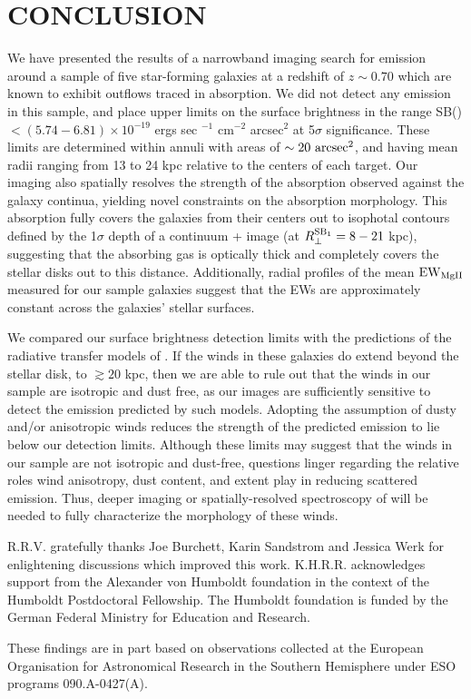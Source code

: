 \documentclass[twocolumn]{aastex62}
\begin{document}
\section{CONCLUSION}\label{sec:conclusion}
We have presented the results of a narrowband imaging search for  emission around a sample of five star-forming galaxies at a redshift of $z \sim 0.70$ which are known to exhibit outflows traced in  absorption. We did not detect any  emission in this sample, and place  upper limits on the surface brightness in the range SB() $< (5.74-6.81) \times 10^{-19}$ ergs sec $^{-1}$ cm$^{-2}$ arcsec$^2$ at 5$\sigma$ significance. These limits are determined within annuli with areas of $\sim 20~\rm arcsec^2$, and having mean radii ranging from 13 to 24 kpc relative to the centers of each target. Our imaging also spatially resolves the strength of the  absorption observed against the galaxy continua, yielding novel constraints on the  absorption morphology. 
This absorption fully covers the galaxies from their centers out to isophotal contours defined by the %
1$\sigma$ depth of a continuum +  image (at %
$R_{\perp}^{\rm SB_1} = 8-21$ kpc),
suggesting that the absorbing gas is optically thick and completely covers the stellar disks out to this distance. Additionally, radial profiles of the mean $\rm EW_{MgII}$ measured for our sample galaxies suggest that the EWs %
are approximately constant across the galaxies' stellar surfaces. 

We compared our surface brightness detection limits with the predictions of the radiative transfer models of \cite{Prochaska_2011}. If the winds in these galaxies do extend beyond the stellar disk, to $\gtrsim 20$ kpc, then we are able to rule out that the winds in our sample are isotropic and dust free, as our images are sufficiently sensitive to detect the emission predicted by such models. Adopting the assumption of dusty and/or anisotropic winds reduces the strength of the predicted  emission to lie below our detection limits. Although these limits may suggest that the winds in our sample are not isotropic and dust-free, questions linger regarding the relative roles wind anisotropy, dust content, and extent play in reducing scattered emission. Thus, deeper imaging or spatially-resolved spectroscopy of  will be needed to fully characterize the morphology of these winds. 

\acknowledgements
R.R.V. gratefully thanks Joe Burchett, Karin Sandstrom and Jessica Werk for enlightening discussions which improved this work.
K.H.R.R. acknowledges support from the Alexander von Humboldt foundation in the context of the Humboldt Postdoctoral Fellowship. The Humboldt foundation is funded by the German Federal Ministry for Education and Research.

These findings are in part based on observations collected at the
European Organisation for Astronomical Research in the Southern
Hemisphere under ESO programs 090.A-0427(A).

\newpage

\end{document}
